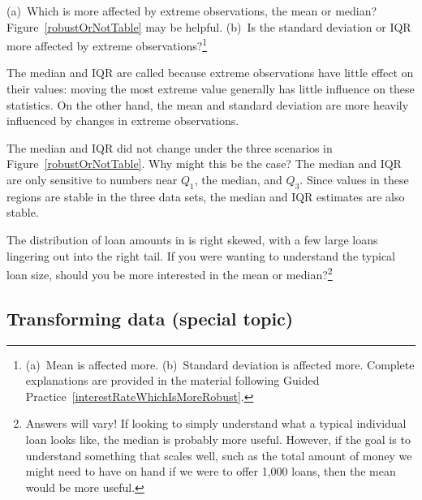 \begin{exercise} \label{interestRateWhichIsMoreRobust}
(a)~Which is more affected by extreme observations,
the mean or median?
Figure~\ref{robustOrNotTable} may be helpful.
(b)~Is the standard deviation or IQR more affected by
extreme observations?\footnote{(a)~Mean is affected more.
(b)~Standard deviation is affected more.
  Complete explanations are provided in the material
  following Guided Practice~\ref{interestRateWhichIsMoreRobust}.}
\end{exercise}

The median and IQR are called  because
extreme observations have little effect on their values:
moving the most extreme value generally has little influence
on these statistics.
On the other hand, the mean and standard deviation
are more heavily influenced by changes in extreme observations.

\begin{example}{The median and IQR did not change under the
    three scenarios in Figure~\ref{robustOrNotTable}.
    Why might this be the case?}
  The median and IQR are only sensitive to numbers
  near $Q_1$, the median, and $Q_3$.
  Since values in these regions are stable in the three
  data sets, the median and IQR estimates are also stable.
\end{example}


\begin{exercise}
The distribution of loan amounts in 
is right skewed, with a few large loans lingering
out into the right tail.
If you were wanting to understand the typical loan size,
should you be more interested in the mean
or median?\footnote{Answers will vary!
  If looking to simply understand what a typical individual
  loan looks like, the median is probably more useful.
  However, if the goal is to understand something that
  scales well, such as the total amount of money we might
  need to have on hand if we were to offer 1,000 loans,
  then the mean would be more useful.}
\end{exercise}



\subsection{Transforming data (special topic)}
\label{transformingDataSubsection}

